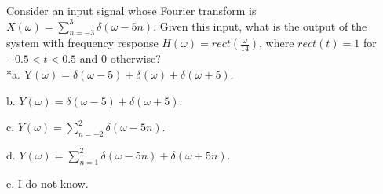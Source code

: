 
Consider an input signal whose Fourier transform is
\(X\left( \omega \right) = \sum_{n=-3}^3\delta(\omega - 5n)\). Given this input, what
is the output of the system with frequency response
\(H\left( \omega \right) = rect\left( \frac{\omega}{14} \right)\), where
\(rect(t) = 1\) for \(- 0.5 < t < 0.5\) and \(0\) otherwise?\\

*a.\(\text{\ Y}\left( \omega \right) = \delta\left( \omega - 5 \right) + \delta\left( \omega \right) + \delta(\omega + 5)\).

b.
\(Y\left( \omega \right) = \delta\left( \omega - 5 \right) + \delta(\omega + 5)\).

c. \(Y\left( \omega \right) =\sum_{n=-2}^2 \delta(\omega - 5n)\).

d.
\(Y\left( \omega \right) =\sum_{n=1}^2 \delta\left( \omega - 5n \right) + \delta(\omega + 5n)\).

e. I do not know.\\
